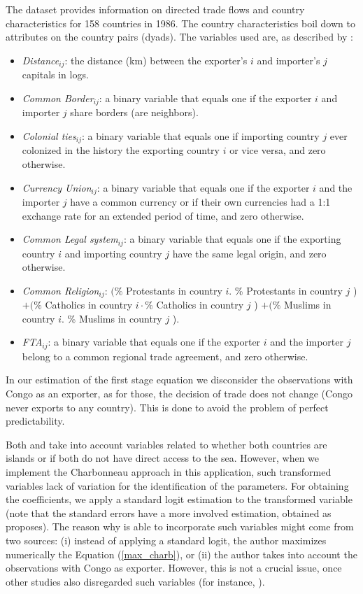 The dataset provides information on directed trade flows and country characteristics for 158 countries in 1986. The country characteristics boil down to attributes on the country pairs (dyads). The variables used are, as described by \cite{helpman2008estimating}:

\begin{itemize}
    \item \textit{Distance}$_{ij}$: the distance (km) between the exporter's $i$ and importer's $j$ capitals in logs.
    \item \textit{Common Border}$_{ij}$: a binary variable that equals one if the exporter $i$ and importer $j$ share borders (are neighbors).
    \item \textit{Colonial ties}$_{ij}$: a binary variable that equals one if importing  country $j$ ever colonized in the history the exporting country $i$ or vice versa, and zero otherwise.
    \item \textit{Currency Union}$_{ij}$: a binary variable that equals one if the exporter $i$ and the importer $j$ have a common currency or if their own currencies had a 1:1 exchange rate for an extended period of time, and zero otherwise.
    \item \textit{Common Legal system}$_{ij}$: a binary variable that equals one if the exporting country $i$ and importing country $j$ have the same legal origin, and zero otherwise.
    \item \textit{Common Religion}$_{ij}$: $(\%$ Protestants in country $i$. \% Protestants in country $j$ ) $+(\%$ Catholics in country $i \cdot \%$ Catholics in country $j$ ) $+(\%$ Muslims in country $i$. \% Muslims in country $j$ ).
    \item \textit{FTA}$_{ij}$: a binary variable that equals one if the exporter $i$ and the importer $j$ belong to a common regional trade agreement, and zero otherwise.
\end{itemize}

In our estimation of the first stage equation we disconsider the observations with Congo as an exporter, as for those, the decision of trade does not change (Congo never exports to any country). This is done to avoid the problem of perfect predictability.

Both \cite{helpman2008estimating} and \cite{charbonneau2017multiple} take into account variables related to whether both countries are islands or if both do not have direct access to the sea. However, when we implement the Charbonneau approach in this application, such transformed variables lack of variation for the identification of the parameters. For obtaining the coefficients, we apply a standard logit estimation to the transformed variable (note that the standard errors have a more involved estimation, obtained as \cite{jochmans2018semiparametric} proposes). The reason why \cite{charbonneau2017multiple} is able to incorporate such variables might come from two sources: (i) instead of applying a standard logit, the author maximizes numerically the Equation (\ref{max_charb}), or (ii) the author takes into account the observations with Congo as exporter. However, this is not a crucial issue, once other studies also disregarded such variables (for instance, \cite{jochmans2018semiparametric}).

